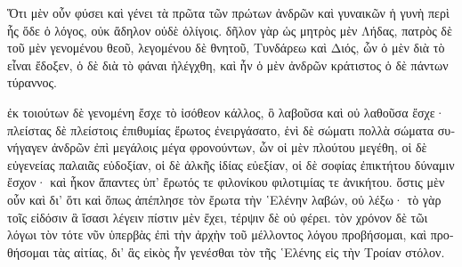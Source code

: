 {\large
\begin{greek}
\noindent Ὅτι μὲν οὖν φύσει καὶ γένει τὰ πρῶτα τῶν πρώτων ἀνδρῶν καὶ γυναικῶν ἡ γυνὴ περὶ ἧς ὅδε ὁ λόγος, οὐκ ἄδηλον οὐδὲ ὀλίγοις. δῆλον γὰρ ὡς μητρὸς μὲν Λήδας, πατρὸς δὲ τοῦ μὲν γενομένου θεοῦ, λεγομένου δὲ θνητοῦ, Τυνδάρεω καὶ Διός, ὧν ὁ μὲν διὰ τὸ εἶναι ἔδοξεν, ὁ δὲ διὰ τὸ φάναι ἠλέγχθη, καὶ ἦν ὁ μὲν ἀνδρῶν κράτιστος ὁ δὲ πάντων τύραννος. 

ἐκ τοιούτων δὲ γενομένη ἔσχε τὸ ἰσόθεον κάλλος, ὃ λαβοῦσα καὶ οὐ λαθοῦσα ἔσχε· πλείστας δὲ πλείστοις ἐπιθυμίας ἔρωτος ἐνειργάσατο, ἑνὶ δὲ σώματι πολλὰ σώματα συνήγαγεν ἀνδρῶν ἐπὶ μεγάλοις μέγα φρονούντων, ὧν οἱ μὲν πλούτου μεγέθη, οἱ δὲ εὐγενείας παλαιᾶς εὐδοξίαν, οἱ δὲ ἀλκῆς ἰδίας εὐεξίαν, οἱ δὲ σοφίας ἐπικτήτου δύναμιν ἔσχον· καὶ ἧκον ἅπαντες ὑπ' ἔρωτός τε φιλονίκου φιλοτιμίας τε ἀνικήτου. ὅστις μὲν οὖν καὶ δι' ὅτι καὶ ὅπως ἀπέπλησε τὸν ἔρωτα τὴν ῾Ελένην λαβών, οὐ λέξω· τὸ γὰρ τοῖς εἰδόσιν ἃ ἴσασι λέγειν πίστιν μὲν ἔχει, τέρψιν δὲ οὐ φέρει. τὸν χρόνον δὲ τῶι λόγωι τὸν τότε νῦν ὑπερβὰς ἐπὶ τὴν ἀρχὴν τοῦ μέλλοντος λόγου προβήσομαι, καὶ προθήσομαι τὰς αἰτίας, δι' ἃς εἰκὸς ἦν γενέσθαι τὸν τῆς ῾Ελένης εἰς τὴν Τροίαν στόλον.

\end{greek}

}

